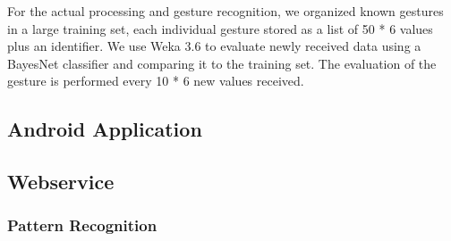 For the actual processing and gesture recognition, we organized known gestures in a large training set, each individual gesture stored as a list of 50 * 6 values plus an identifier. 
We use Weka 3.6 to evaluate newly received data using a BayesNet classifier and comparing it to the training set.
The evaluation of the gesture is performed every 10 * 6 new values received.

\subsection{Android Application}

\subsection{Webservice}


\subsubsection{Pattern Recognition}